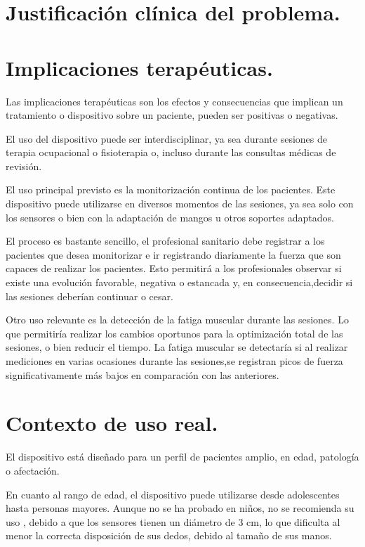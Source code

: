 \section{Justificación clínica del problema.}

\section{Implicaciones terapéuticas.}
Las implicaciones terapéuticas son los efectos y consecuencias que implican un tratamiento o dispositivo sobre un paciente, pueden ser positivas o negativas.

El uso del dispositivo puede ser interdisciplinar, ya sea durante sesiones de terapia ocupacional o fisioterapia o, incluso durante las consultas médicas de revisión. 

El uso principal previsto es la monitorización continua de los pacientes. Este dispositivo puede utilizarse en diversos momentos de las sesiones, ya sea solo con los sensores o bien con la adaptación de mangos u otros soportes adaptados.

El proceso es bastante sencillo, el profesional sanitario debe registrar a los pacientes que desea monitorizar e ir registrando diariamente la fuerza que son capaces de realizar los pacientes. Esto permitirá a los profesionales observar si existe una evolución favorable, negativa o estancada y, en consecuencia,decidir si las sesiones deberían continuar o cesar. 

Otro uso relevante es la detección de la fatiga muscular durante las sesiones. Lo que permitiría realizar los cambios oportunos para la optimización total de las sesiones, o bien reducir el tiempo. La fatiga muscular se detectaría si al realizar mediciones en varias ocasiones durante las sesiones,se registran picos de fuerza significativamente más bajos en comparación con las anteriores.

\section{Contexto de uso real.}
El dispositivo está diseñado para un perfil de pacientes amplio, en edad, patología o afectación.

En cuanto al rango de edad, el dispositivo puede utilizarse desde adolescentes hasta personas mayores. Aunque no se ha probado en niños, no se recomienda su uso , debido a que los sensores tienen un diámetro de 3 cm, lo que dificulta al menor la correcta disposición de sus dedos, debido al tamaño de sus manos.


